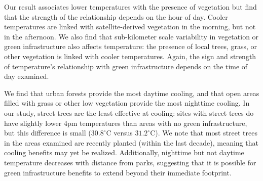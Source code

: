 \documentclass[draft,linenumbers]{agujournal}
\begin{document}
  

Our result associates lower temperatures with the presence of vegetation but find that the strength of the relationship depends on the hour of day. Cooler temperatures are linked with satellite-derived vegetation in the morning, but not in the afternoon.  We also find that sub-kilometer scale variability in vegetation or green infrastructure also affects temperature: the presence of local trees, grass, or other vegetation is linked with cooler temperatures. Again, the sign and strength of temperature's relationship with green infrastructure depends on the time of day examined. 

We find that urban forests provide the most daytime cooling, and that open areas filled with grass or other low vegetation provide the most nighttime cooling. 
In our study, street trees are the least effective at cooling:  sites with street trees do have slightly lower 4pm temperatures than areas with no green infrastructure, but this difference is small ($30.8^\circ$C versus $31.2^\circ$C). 
We note that most street trees in the areas examined are recently planted (within the last decade), meaning that cooling benefits may yet be realized. 
Additionally, nighttime but not daytime temperature decreases with distance from parks, suggesting that it is possible for green infrastructure benefits to extend beyond their immediate footprint. 
\end{document}
